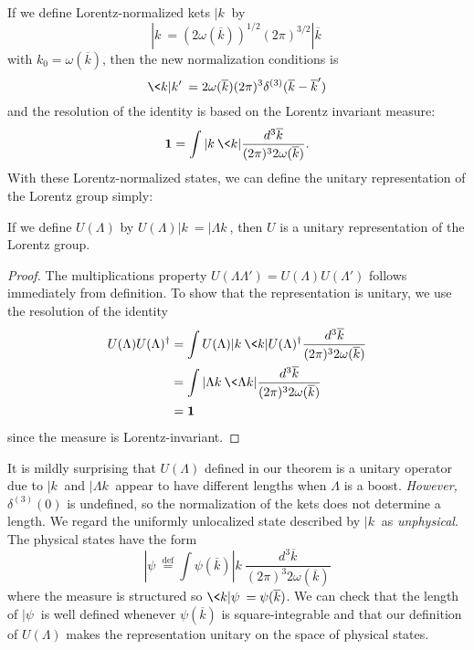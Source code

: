 If we define Lorentz-normalized kets $|k\>$ by
\begin{equation}%
|k\> = \left(2\omega(\overline{k})\right)^{1/2}(2\pi)^{3/2}|\overline{k}\>
\end{equation}
with $k_{0}=\omega(\overline{k})$, then the new normalization
conditions is
\begin{equation}%
\<k|k'\> = 2\omega(\overline{k})(2\pi)^{3}\delta^{(3)}(\overline{k}-\overline{k}')
\end{equation}
and the resolution of the identity is based on the Lorentz
invariant measure:
\begin{equation}%
\mathbf{1} = \int|k\>\<k|\frac{d^{3}\overline{k}}{(2\pi)^{3}2\omega(\overline{k})}.
\end{equation}
With these Lorentz-normalized states, we can define the unitary
representation of the Lorentz group simply:
\begin{thm}%
If we define $U(\Lambda)$ by $U(\Lambda)|k\>=|\Lambda k\>$, then
$U$ is a unitary representation of the Lorentz group.
\end{thm}
\begin{proof}
The multiplications property
$U(\Lambda\Lambda')=U(\Lambda)U(\Lambda')$ follows immediately
from definition. To show that the representation is unitary, we
use the resolution of the identity
\begin{subequations}
\begin{align}
U(\Lambda)U(\Lambda)^{\dag} &= \int U(\Lambda)|k\>\<k|U(\Lambda)^{\dag}\frac{d^{3}\overline{k}}{(2\pi)^{3}2\omega(\overline{k})}\\
&= \int |\Lambda k\>\<\Lambda k|\frac{d^{3}\overline{k}}{(2\pi)^{3}2\omega(\overline{k})}\\
&= \mathbf{1}
\end{align}
\end{subequations}
since the measure is Lorentz-invariant.
\end{proof}
It is mildly surprising that $U(\Lambda)$ defined in our theorem
is a unitary operator due to $|k\>$ and $|\Lambda k\>$ appear to
have different lengths when $\Lambda$ is a boost. \emph{However,}
$\delta^{(3)}(0)$ is undefined, so the normalization of the kets
does not determine a length. We regard the uniformly unlocalized
state described by $|k\>$ as \emph{unphysical}. The physical
states have the form 
\begin{equation}%
|\psi\>\stackrel{\text{def}}{=} \int \psi(\overline{k})|k\>\frac{d^{3}\overline{k}}{(2\pi)^{3}2\omega(\overline{k})}
\end{equation}
where the measure is structured so
$\<k|\psi\>=\psi(\overline{k})$. We can check that the length of
$|\psi\>$ is well defined whenever $\psi(\overline{k})$ is
square-integrable and that our definition of $U(\Lambda)$ makes
the representation unitary on the space of physical states.
